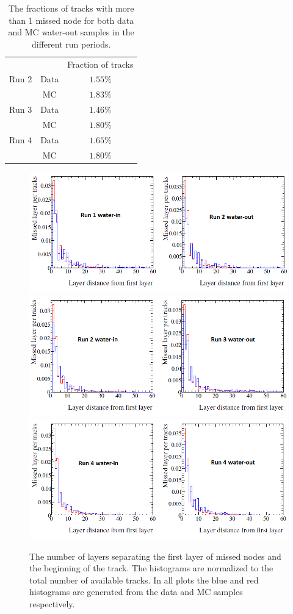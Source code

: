 \begin{table}[h]
\caption{The fractions of tracks with more than 1 missed node 
for both data and MC water-out samples in the different run periods.}
\centering
\begin{tabular}{lcc}\toprule
      & &  Fraction of tracks \\
\cline{2-3}
Run 2 & Data & $1.55\%$  \\ 
      & MC & $1.83\%$  \\ 
\cline{2-3}
Run 3 & Data & $1.46\%$  \\ 
      & MC & $1.80\%$ \\ 
\cline{2-3}
Run 4 & Data & $1.65\%$  \\ 
      & MC & $1.80\%$ \\ 
\bottomrule
\end{tabular}
\label{tab:NodeMissFractionsWaterOut}
\end{table}

\begin{figure}
\centering
\includegraphics[width=5in]{Figures/layeff1.png}
\includegraphics[width=5in]{Figures/layeff2.png}
\includegraphics[width=5in]{Figures/layeff3.png}
\caption{The number of layers separating the first layer of missed nodes and the beginning of the track. The histograms are normalized to the total number of available tracks.
In all plots the blue and red histograms are generated from the data and MC samples
respectively.
}
\label{fig:MisssedNodePerTracks}
\end{figure}


